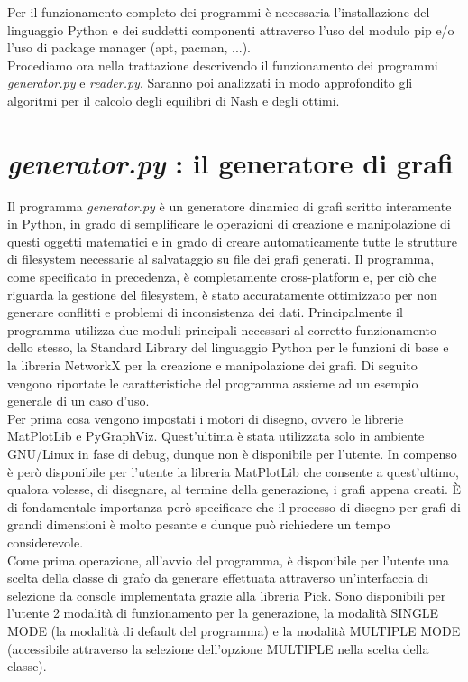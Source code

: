 Per il funzionamento completo dei programmi è necessaria l'installazione del linguaggio Python e dei suddetti componenti attraverso l'uso del modulo pip e/o l'uso di package manager (apt, pacman, ...).\\
Procediamo ora nella trattazione descrivendo il funzionamento dei programmi \textit{generator.py} e \textit{reader.py}. Saranno poi analizzati in modo approfondito gli algoritmi per il calcolo degli equilibri di Nash e degli ottimi.\\

\section{\textit{generator.py} : il generatore di grafi}
\justify
Il programma \textit{generator.py} è un generatore dinamico di grafi scritto interamente in Python, in grado di semplificare le operazioni di creazione e manipolazione di questi oggetti matematici e in grado di creare automaticamente tutte le strutture di filesystem necessarie al salvataggio su file dei grafi generati. Il programma, come specificato in precedenza, è completamente cross-platform e, per ciò che riguarda la gestione del filesystem, è stato accuratamente ottimizzato per non generare conflitti e problemi di inconsistenza dei dati. Principalmente il programma utilizza due moduli principali necessari al corretto funzionamento dello stesso, la Standard Library del linguaggio Python per le funzioni di base e la libreria NetworkX per la creazione e manipolazione dei grafi. Di seguito vengono riportate le caratteristiche del programma assieme ad un esempio generale di un caso d'uso.\\
Per prima cosa vengono impostati i motori di disegno, ovvero le librerie MatPlotLib e PyGraphViz. Quest'ultima è stata utilizzata solo in ambiente GNU/Linux in fase di debug, dunque non è disponibile per l'utente. In compenso è però disponibile per l'utente la libreria MatPlotLib che consente a quest'ultimo, qualora volesse, di disegnare, al termine della generazione, i grafi appena creati. È di fondamentale importanza però specificare che il processo di disegno per grafi di grandi dimensioni è molto pesante e dunque può richiedere un tempo considerevole.\\
Come prima operazione, all'avvio del programma, è disponibile per l'utente una scelta della classe di grafo da generare effettuata attraverso un'interfaccia di selezione da console implementata grazie alla libreria Pick. Sono disponibili per l'utente 2 modalità di funzionamento per la generazione, la modalità SINGLE MODE (la modalità di default del programma) e la modalità MULTIPLE MODE (accessibile attraverso la selezione dell'opzione MULTIPLE nella scelta della classe).\\

